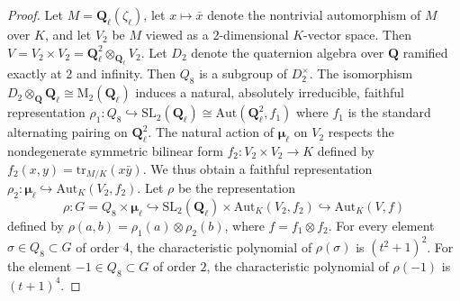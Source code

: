 \documentclass{amsart}
\def\Q{{\mathbf Q}}
\def\f{{\tilde F}}
\def\Aut{\mathrm{Aut}}
\def\tr{\mathrm{tr}}
\def\SL{\mathrm{SL}}
\def\M{\mathrm{M}}
\def\f{f}
\def\bmu{\boldsymbol \mu}
\theoremstyle{definition}
\begin{document}
\begin{proof}
Let $M=\Q_\ell(\zeta_\ell)$, let $x \mapsto {\bar x}$ denote
the nontrivial automorphism of $M$ over $K$, and let $V_2$ be
$M$ viewed as a $2$-dimensional $K$-vector space.
Then $V=V_2 \times V_2 = \Q_\ell^2 \otimes_{\Q_\ell} V_2$.
Let $D_2$ denote the quaternion algebra over $\Q$ ramified
exactly at $2$ and infinity. Then $Q_8$ is a subgroup of
$D_2^\times$. The isomorphism 
$D_2 \otimes_\Q \Q_\ell \cong \M_2(\Q_\ell)$
induces a natural, absolutely irreducible, faithful representation  
$\rho_1 :  Q_8 \hookrightarrow \SL_2(\Q_\ell)
\cong \Aut(\Q_\ell^2,\f_1)$ where $\f_1$ is the standard
alternating pairing on $\Q_\ell^2$.
The natural action of $\bmu_\ell$ on $V_2$ 
respects the
nondegenerate symmetric bilinear form
${\f}_2 : V_2 \times V_2 \to K$ 
defined by ${\f}_2(x,y) = \tr_{M/K}(x{\bar y})$.
We thus obtain a faithful representation 
$\rho_2 : \bmu_\ell \hookrightarrow \Aut_K(V_2,\f_2)$.
Let $\rho$ be the representation
$$\rho : G = Q_8 \times \bmu_\ell \hookrightarrow 
\SL_2(\Q_\ell) \times \Aut_K(V_2,\f_2) \hookrightarrow \Aut_K(V,\f)$$
defined by $\rho(a,b) = \rho_1(a) \otimes \rho_2(b)$,
where $f=f_1\otimes f_2$. 
For every element $\sigma \in Q_8 \subset G$ of order $4$, 
the characteristic polynomial of $\rho(\sigma)$ is
$(t^2+1)^2$. 
For the element $-1 \in Q_8 \subset G$ of order $2$,
the characteristic polynomial of $\rho(-1)$ is
$(t+1)^4$. 


\end{proof}
\end{document}
